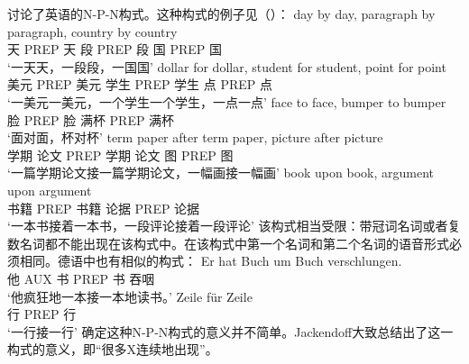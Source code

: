 \begin{exe}
\begin{xlist}[iv.]
\begin{exe}
\begin{xlist}[iv.]
\largerpage
\mbox{}\citet{Jackendoff2008a}讨论了英语的N-P-N构式。这种构式的例子见（）：
\eal
\ex 
\gll day by day, paragraph by paragraph, country by country\\
     天 PREP 天 段 PREP 段 国 PREP 国\\
\glt `一天天，一段段，一国国'
\ex
\gll dollar for dollar, student for student, point for point\\
     美元 PREP 美元 学生 PREP 学生 点 PREP 点\\
\glt `一美元一美元，一个学生一个学生，一点一点' 
\ex 
\gll face to face, bumper to bumper\\
     脸 PREP 脸 满杯 PREP 满杯\\
\glt `面对面，杯对杯'
\ex
\gll term paper after term paper, picture after picture\\
     学期 论文 PREP 学期 论文 图 PREP 图\\
\glt `一篇学期论文接一篇学期论文，一幅画接一幅画' 
\ex 
\gll book upon book, argument upon argument\\
     书籍 PREP 书籍 论据 PREP 论据\\
\glt `一本书接着一本书，一段评论接着一段评论'
\zl
该构式相当受限：带冠词名词或者复数名词都不能出现在该构式中。在该构式中第一个名词和第二个名词的语音形式必须相同。德语中也有相似的构式：
\eal
\ex 
\gll Er hat Buch um Buch verschlungen.\\
	 他 AUX 书 PREP 书 吞咽\\
\glt `他疯狂地一本接一本地读书。'
\ex 
\gll Zeile für Zeile\footnotemark\\
	 行 PREP 行\\
\glt `一行接一行'
\zl
确定这种N-P-N构式的意义并不简单。Jackendoff大致总结出了这一构式的意义，即“很多X连续地出现”。


\end{xlist}
\end{exe}
\end{xlist}
\end{exe}
